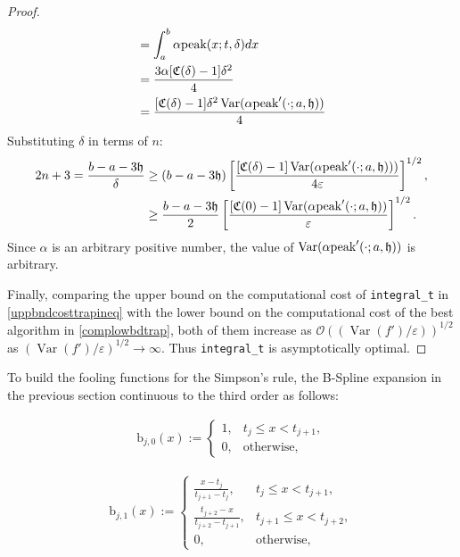 \documentclass{iitthesis}
\DeclareMathOperator{\Var}{Var}
\theoremstyle{definition}
\theoremstyle{remark}
\begin{document}
\begin{proof}
\begin{subequations}
\begin{align*}
     &=\int_{a}^{b}\alpha\textup{peak}(x;t,\delta)dx\\
     &=\frac{3\alpha[\mathfrak{C}(\delta)-1]\delta^2}{4}\\
     &=\frac{[\mathfrak{C}(\delta)-1]\delta^2\Var(\alpha\textup{peak}'(\cdot;a,\mathfrak{h}))}{4}
  \end{align*}
  \end{subequations}
  Substituting $\delta$  in terms of $n$:
      \begin{align*}
        2n+3=\frac{b-a-3\mathfrak{h}}{\delta}&\ge(b-a-3\mathfrak{h})\left[\frac{[\mathfrak{C}(\delta)-1]\Var(\alpha \textup{peak}'(\cdot;a,\mathfrak{h})))}{4\varepsilon}\right]^{1/2},\\
        &\ge\frac{b-a-3\mathfrak{h}}{2}\left[\frac{[\mathfrak{C}(0)-1]\Var(\alpha \textup{peak}'(\cdot;a,\mathfrak{h}))}{\varepsilon}\right]^{1/2}.
    \end{align*}
    Since $\alpha$ is an arbitrary positive number, the value of $\Var(\alpha \textup{peak}'(\cdot;a,\mathfrak{h}))$ is arbitrary.

    Finally, comparing the upper bound on the computational cost of {\tt integral\_t} in \eqref{uppbndcosttrapineq} with the lower bound on the computational cost of the best algorithm in \eqref{complowbdtrap}, both of them increase as $\mathcal{O}((\Var(f')/\varepsilon))^{1/2}$ as $(\Var(f')/\varepsilon)^{1/2}\rightarrow \infty$. Thus {\tt integral\_t} is asymptotically optimal.
\end{proof}


To build the fooling functions for the Simpson's rule, the B-Spline expansion in the previous section continuous to the third order as follows:

\begin{align*}
  \text{b}_{j,0}(x):= \begin{cases} \displaystyle 1, & t_{j} \le x < t_{j+1},\\[1ex]
\displaystyle  0, & \text{otherwise},
\end{cases}
\end{align*}

\begin{align*}
  \text{b}_{j,1}(x):= \begin{cases} \displaystyle \frac{x-t_{j}}{t_{j+1}-t_{j}}, & t_{j} \le x < t_{j+1},\\[1ex]
\displaystyle \frac{t_{j+2}-x}{t_{j+2}-t_{j+1}}, & t_{j+1} \le x < t_{j+2},\\[1ex]
\displaystyle  0, & \text{otherwise},
\end{cases}
\end{align*}
\end{document}
